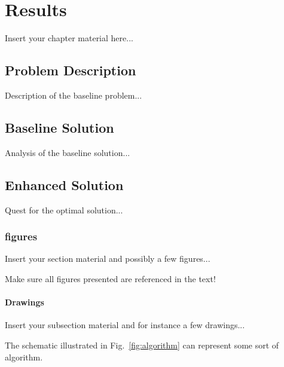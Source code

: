 \chapter{Results}
\label{chapter:results}

Insert your chapter material here...


\section{Problem Description}
\label{section:problem}

Description of the baseline problem...


\section{Baseline Solution}
\label{section:baseline}

Analysis of the baseline solution...


\section{Enhanced Solution}
\label{section:enhanced}

Quest for the optimal solution...


\subsection{figures}
\label{subsection:figures}

Insert your section material and possibly a few figures...

Make sure all figures presented are referenced in the text!


\subsubsection{Drawings}
\label{subsection:drawings}

Insert your subsection material and for instance a few drawings...

The schematic illustrated in Fig.~\ref{fig:algorithm} can represent some sort of algorithm.

